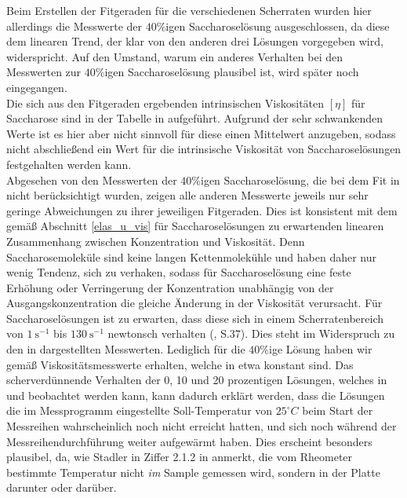 \documentclass[11pt,a4paper,oneside]{scrartcl}
\begin{document}
 Beim Erstellen der Fitgeraden für die verschiedenen Scherraten wurden hier allerdings die Messwerte der $40\%$igen Saccharoselösung ausgeschlossen, da diese dem linearen Trend, der klar von den anderen drei Lösungen vorgegeben wird, widerspricht. Auf den Umstand, warum ein anderes Verhalten bei den Messwerten zur $40\%$igen Saccharoselösung plausibel ist, wird später noch eingegangen.\\
Die sich aus den Fitgeraden
ergebenden intrinsischen Viskositäten $[\eta]$ für Saccharose sind in der Tabelle in  aufgeführt. Aufgrund der sehr schwankenden Werte ist es hier aber nicht sinnvoll für diese einen Mittelwert
anzugeben, sodass nicht abschließend ein Wert für die intrinsische Viskosität von Saccharoselösungen festgehalten werden kann.\\
 Abgesehen von den Messwerten der $40\%$igen Saccharoselösung, die bei dem Fit in  nicht berücksichtigt wurden, zeigen alle anderen Messwerte jeweils nur sehr geringe Abweichungen zu ihrer jeweiligen Fitgeraden. Dies ist konsistent mit dem gemäß Abschnitt \ref{elas_u_vis} für Saccharoselösungen zu erwartenden linearen Zusammenhang zwischen Konzentration und Viskosität. Denn Saccharosemoleküle sind keine langen Kettenmolekühle und haben daher nur wenig
Tendenz, sich zu verhaken, sodass für Saccharoselösung eine feste Erhöhung oder Verringerung der Konzentration unabhängig von der Ausgangskonzentration die gleiche Änderung in der Viskosität verursacht.
Für Saccharoselösungen ist zu erwarten, dass diese sich in einem Scherratenbereich von $1\ \mathrm s^{-1}$ bis $130\ \mathrm s^{-1}$ newtonsch verhalten (\cite{petra}, S.37). Dies steht im Widerspruch zu den in  dargestellten Messwerten. Lediglich für die $40\%$ige Lösung
haben wir gemäß  Viskositätsmesswerte erhalten, welche in etwa konstant sind. Das scherverdünnende Verhalten der 0, 10 und 20 prozentigen Lösungen, welches in  und  beobachtet werden kann, kann dadurch erklärt werden, dass die Lösungen die im Messprogramm eingestellte Soll-Temperatur von $25^{\circ}C$ beim Start der Messreihen wahrscheinlich noch nicht erreicht hatten, und sich noch während der Messreihendurchführung
weiter aufgewärmt haben. Dies erscheint besonders plausibel, da, wie Stadler in Ziffer 2.1.2 in  \cite{Stadler2014} anmerkt, die vom Rheometer bestimmte Temperatur nicht \emph{im} Sample gemessen wird, sondern in der Platte darunter oder darüber.
\end{document}
